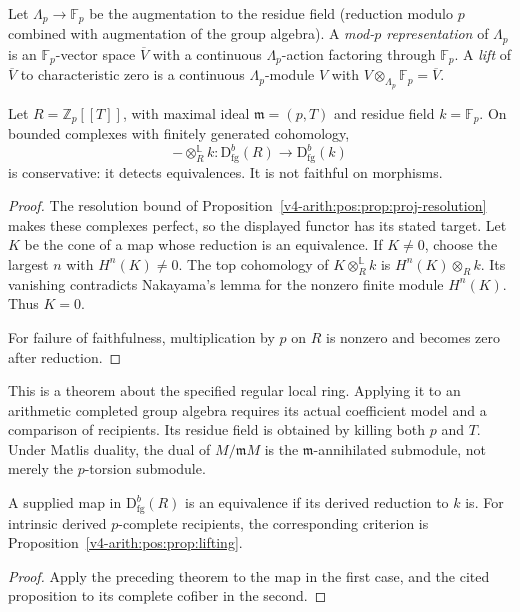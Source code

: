 Let \(\Lambda_{p}\to\mathbb{F}_{p}\) be the augmentation to the residue
field (reduction modulo \(p\) combined with augmentation of the group
algebra). A \emph{mod-\(p\) representation} of \(\Lambda_{p}\) is an
\(\mathbb{F}_{p}\)-vector space \(\overline{V}\) with a continuous
\(\Lambda_{p}\)-action factoring through \(\mathbb{F}_{p}\). A
\emph{lift} of \(\overline{V}\) to characteristic zero is a continuous
\(\Lambda_{p}\)-module \(V\) with \(V\otimes_{\Lambda_{p}}\mathbb{F}_{p}=\overline{V}\).

\begin{theorem}
\label{v4-arith:w5-d:lift:thm:faithful}
Let \(R=\mathbb Z_p[[T]]\), with maximal ideal
\(\mathfrak m=(p,T)\) and residue field \(k=\mathbb F_p\).
On bounded complexes with finitely generated cohomology,
\begin{equation}
\label{v4-arith:w5-d:eq:base-change-functor}
 -\otimes_R^{\mathbb L}k:
 \mathrm D^b_{\mathrm{fg}}(R)\longrightarrow
 \mathrm D^b_{\mathrm{fg}}(k)
\end{equation}
is conservative: it detects equivalences.
It is not faithful on morphisms.
\end{theorem}
\begin{proof}
The resolution bound of
Proposition~\ref{v4-arith:pos:prop:proj-resolution} makes
these complexes perfect, so the displayed functor has its
stated target. Let \(K\) be the cone of a map whose reduction
is an equivalence. If \(K\ne0\), choose the largest \(n\)
with \(H^n(K)\ne0\).
The top cohomology of \(K\otimes_R^{\mathbb L}k\) is
\(H^n(K)\otimes_R k\).
Its vanishing contradicts Nakayama's lemma for the nonzero
finite module \(H^n(K)\). Thus \(K=0\).

For failure of faithfulness, multiplication by \(p\) on \(R\)
is nonzero and becomes zero after reduction.
\end{proof}

This is a theorem about the specified regular local ring.
Applying it to an arithmetic completed group algebra requires
its actual coefficient model and a comparison of recipients.
Its residue field is obtained by killing both \(p\) and \(T\).
Under Matlis duality, the dual of \(M/\mathfrak m M\)
is the \(\mathfrak m\)-annihilated submodule, not merely the
\(p\)-torsion submodule.

\begin{corollary}
\label{v4-arith:w5-d:lift:cor:subitem-3}
A supplied map in \(\mathrm D^b_{\mathrm{fg}}(R)\) is an
equivalence if its derived reduction to \(k\) is.
For intrinsic derived \(p\)-complete recipients, the corresponding
criterion is Proposition~\ref{v4-arith:pos:prop:lifting}.
\end{corollary}
\begin{proof}
Apply the preceding theorem to the map in the first case,
and the cited proposition to its complete cofiber in the second.
\end{proof}

